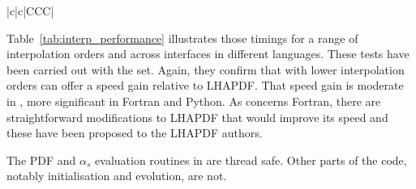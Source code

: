 \begin{table}[htbp]
\begin{tabular}{|c|c|CCC|}
  \end{tabular}
  \caption{Time for a call to
  , which evaluates all flavours at a given $x,Q$
  point.
  The rows show the timings with different
  interpolation orders.
  The results have been obtained with the  set, on an M2Pro with
  gfortran-15.1, Apple clang version 17.0.0, O3 optimisation and
  Python 3.12.7.
  The hoppet grid spacings are $\ttt{dy}=0.05$ and
  $\ttt{dlnlnQ}=\ttt{dy}/4$, with $\ttt{ymax} = 14$.
  The table also shows the timings for the equivalent calls in
  LHAPDF~6.5.5.
  Version 6.5.5 of LHAPDF, in its Fortran (,
  ) and Python () 
  interfaces, 
   loops over an underlying call to single-flavour evaluation
  (), 
  which is why it is significantly slower than the \CPP interface,
  which evaluates all flavours in one go.
  A proposed patch for the Fortran and Python interfaces has been submitted
  to LHAPDF with corresponding timings also indicated.
}
  \label{tab:interp_performance}
\end{table}

Table~\ref{tab:interp_performance} illustrates those timings for a range of
interpolation orders and across interfaces in different languages.
%
These tests have been carried out with the  set.
%
Again, they confirm that \hoppet with lower interpolation orders
can offer a speed gain relative to LHAPDF.
%
That speed gain is moderate in \CPP, more significant in Fortran and
Python.
%
As concerns Fortran, there are straightforward modifications to LHAPDF
that would improve its speed and these have been proposed to the
LHAPDF authors.

The PDF and $\alpha_s$ evaluation routines in \hoppet are
thread safe.
%
Other parts of the code, notably initialisation and evolution, are not.


